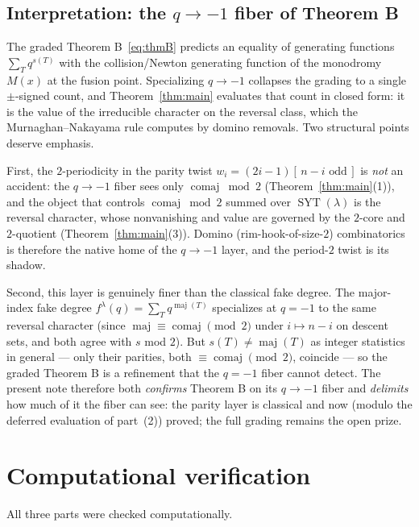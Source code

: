 \documentclass[11pt]{article}
\theoremstyle{definition}
\DeclareMathOperator{\maj}{maj}
\DeclareMathOperator{\comaj}{comaj}
\DeclareMathOperator{\SYT}{SYT}
\begin{document}
\subsection*{Interpretation: the $q\to-1$ fiber of Theorem B}

The graded Theorem B~\eqref{eq:thmB} predicts an equality of generating functions
$\sum_T q^{s(T)}$ with the collision/Newton generating function of the monodromy
$M(x)$ at the fusion point.  Specializing $q\to-1$ collapses the grading to a
single $\pm$-signed count, and Theorem~\ref{thm:main} evaluates that count in
closed form: it is the value of the irreducible character on the reversal class,
which the Murnaghan--Nakayama rule computes by domino removals.  Two structural
points deserve emphasis.

First, the $2$-periodicity in the parity twist $w_i=(2i-1)[\,n-i\text{ odd}\,]$
is \emph{not} an accident: the $q\to-1$ fiber sees only $\comaj\bmod2$
(Theorem~\ref{thm:main}(1)), and the object that controls $\comaj\bmod2$ summed
over $\SYT(\lambda)$ is the reversal character, whose nonvanishing and value are
governed by the $2$-core and $2$-quotient (Theorem~\ref{thm:main}(3)).  Domino
(rim-hook-of-size-$2$) combinatorics is therefore the native home of the
$q\to-1$ layer, and the period-$2$ twist is its shadow.

Second, this layer is genuinely finer than the classical fake degree.  The
major-index fake degree $f^\lambda(q)=\sum_T q^{\maj(T)}$ specializes at $q=-1$ to
the same reversal character (since $\maj\equiv\comaj\pmod 2$ under $i\mapsto n-i$
on descent sets, and both agree with $s$ mod $2$).  But $s(T)\ne\maj(T)$ as
integer statistics in general --- only their parities, both $\equiv\comaj\pmod2$,
coincide --- so the graded Theorem B is a refinement that the $q=-1$ fiber cannot
detect.  The present note therefore both \emph{confirms} Theorem B on its $q\to-1$
fiber and \emph{delimits} how much of it the fiber can see: the parity layer is
classical and now (modulo the deferred evaluation of part~(2)) proved; the full
grading remains the open prize.

\section{Computational verification}\label{sec:verify}

All three parts were checked computationally.
\end{document}
